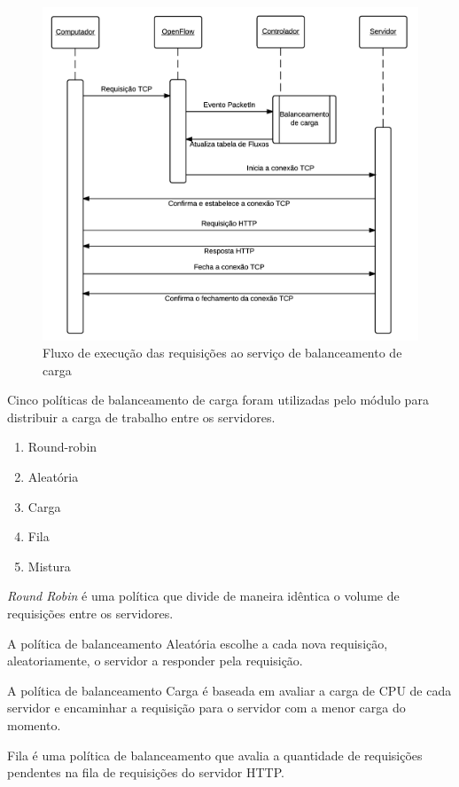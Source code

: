 \begin{figure}[htb!]
    \centering
    \includegraphics[width=\linewidth]{img/balancer-workflow}
    \caption{Fluxo de execução das requisições ao serviço de balanceamento 
    de carga}
    \label{fig:balancer-workflow}
\end{figure}


Cinco políticas de balanceamento de carga foram utilizadas pelo módulo para 
distribuir a carga de trabalho entre os servidores.

\begin{enumerate}
    \item Round-robin
    \item Aleatória
    \item Carga
    \item Fila 
    \item Mistura
\end{enumerate}

\emph{Round Robin} é uma política que divide de maneira idêntica o volume de
requisições entre os servidores.

A política de balanceamento Aleatória escolhe a cada nova requisição, 
aleatoriamente, o servidor a responder pela requisição.

A política de balanceamento Carga é baseada em avaliar a carga de CPU 
de cada servidor e encaminhar a requisição para o servidor com a menor 
carga do momento.
    
Fila é uma política de balanceamento que avalia a quantidade de requisições
pendentes na fila de requisições do servidor HTTP.
    
